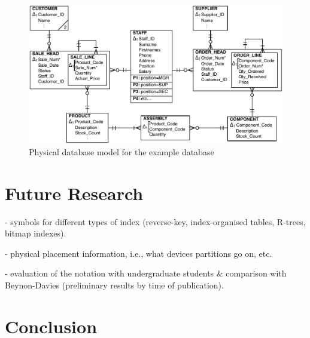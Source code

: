 \documentclass{llncs}
\begin{document}
\begin{figure}
	\includegraphics[width=\columnwidth,keepaspectratio]{Physical-Model}
	\caption{Physical database model for the example database}
	\label{fig-physical-model}
\end{figure}


\section{Future Research}
\label{sec-future}

- symbols for different types of index (reverse-key, index-organised
tables, R-trees, bitmap indexes).

- physical placement information, i.e., what devices partitions go on, etc.

- evaluation of the notation with undergraduate students \& comparison
with Beynon-Davies (preliminary results by time of publication).


\section{Conclusion}
\label{sec-conclusion}





\end{document}
